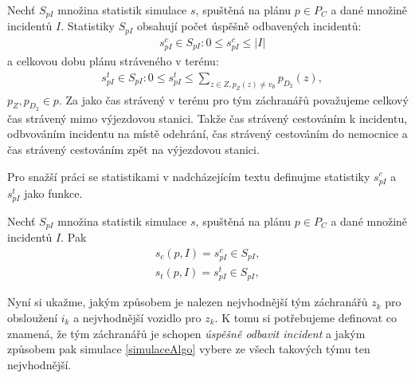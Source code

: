 \begin{definice}\label{df:statsSimul}
  Nechť $S_{pI}$ množina statistik simulace $s$, spuštěná na plánu $p \in P_C$ a dané množině incidentů $I$.
  Statistiky $S_{pI}$ obsahují počet úspěšně odbavených incidentů:
  \begin{align*}
    &s^{c}_{pI} \in S_{pI} \colon 0 \leq s^{c}_{pI} \leq |I|
  \end{align*}
  a celkovou dobu plánu stráveného v terénu:
  \begin{align*}
    &s^{t}_{pI} \in S_{pI} \colon 0 \leq s^{t}_{pI} \leq \sum_{z \in Z, p_Z(z) \neq v_{\emptyset}}{p_{D_2}(z)},
  \end{align*}
  $p_Z, p_{D_2} \in p$. Za jako čas strávený v terénu pro tým záchranářů považujeme celkový čas strávený mimo výjezdovou stanici.
  Takže čas strávený cestováním k incidentu, odbvováním incidentu na místě odehrání, čas strávený cestováním do nemocnice a čas strávený cestováním zpět na výjezdovou stanici.
\end{definice}

Pro snažší práci se statistikami v nadcházejícím textu definujme statistiky $s^c_{pI}$ a $s^t_{pI}$ jako funkce. 

\begin{definice}
  Nechť $S_{pI}$ množina statistik simulace $s$, spuštěná na plánu $p \in P_C$ a dané množině incidentů $I$.
  Pak
  \begin{align*}
    s_c(p, I) = s^c_{pI} \in S_{pI}, \\
    s_t(p, I) = s^t_{pI} \in S_{pI},
  \end{align*}
\end{definice}

Nyní si ukažme, jakým způsobem je nalezen nejvhodnější tým záchranářů $z_k$ pro obsloužení $i_k$ a nejvhodnější vozidlo pro $z_k$.
K tomu si potřebujeme definovat co znamená, že tým záchranářů je schopen \textit{úspěšně odbavit incident}
a jakým způsobem pak simulace \ref{simulaceAlgo} vybere ze všech takových týmu ten nejvhodnější.

